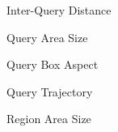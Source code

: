 \documentclass[final,total,bgColor,slideColor,pdf,ps2pdf,default,noaccumulate]{prosper}
\begin{document}
\begin{slide}[R]{Inter-Query Distance}
  \centering
  \scalebox{1.3}{
    \fontsize{8}{8}\selectfont%
    
  }
\end{slide}

\begin{slide}[R]{Query Area Size}
  \centering
  \scalebox{1.3}{
  \fontsize{8}{8}\selectfont%
  
  }
\end{slide}

\begin{slide}[R]{Query Box Aspect}
  \centering
  \scalebox{1.3}{
  \fontsize{8}{8}\selectfont%
  
  }
\end{slide}

\begin{slide}[R]{Query Trajectory}
  \centering
  \scalebox{1.3}{
  \fontsize{8}{8}\selectfont%
  
  }
\end{slide}

\begin{slide}[R]{Region Area Size}
  \centering
  \scalebox{1.3}{
  \fontsize{8}{8}\selectfont%
  
  }
\end{slide}
\end{document}
